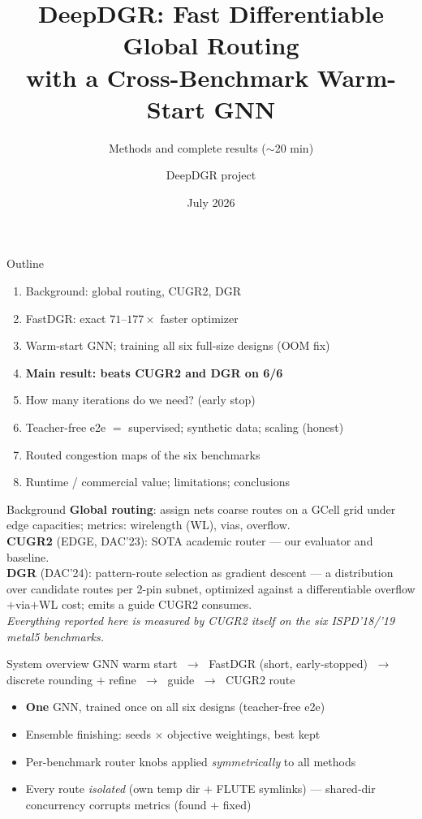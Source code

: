 \documentclass[10pt]{beamer}
\title{DeepDGR: Fast Differentiable Global Routing\\with a Cross-Benchmark Warm-Start GNN}
\subtitle{Methods and complete results (${\sim}$20 min)}
\author{DeepDGR project}
\date{July 2026}
\begin{document}
\begin{frame}\titlepage\end{frame}

\begin{frame}{Outline}
\begin{enumerate}
\item Background: global routing, CUGR2, DGR
\item FastDGR: exact $71$--$177\times$ faster optimizer
\item Warm-start GNN; training all six full-size designs (OOM fix)
\item \textbf{Main result: beats CUGR2 and DGR on 6/6}
\item How many iterations do we need? (early stop)
\item Teacher-free e2e $=$ supervised; synthetic data; scaling (honest)
\item Routed congestion maps of the six benchmarks
\item Runtime / commercial value; limitations; conclusions
\end{enumerate}
\end{frame}

\begin{frame}{Background}
\textbf{Global routing}: assign nets coarse routes on a GCell grid under
edge capacities; metrics: wirelength (WL), vias, overflow.\\[6pt]
\textbf{CUGR2} (EDGE, DAC'23): SOTA academic router --- our evaluator and
baseline.\\[4pt]
\textbf{DGR} (DAC'24): pattern-route selection as gradient descent ---
a distribution over candidate routes per 2-pin subnet, optimized against a
differentiable overflow$+$via$+$WL cost; emits a guide CUGR2 consumes.\\[8pt]
\emph{Everything reported here is measured by CUGR2 itself on the six
ISPD'18/'19 metal5 benchmarks.}
\end{frame}

\begin{frame}{System overview}
\centering
\small
GNN warm start $\;\rightarrow\;$ FastDGR (short, early-stopped)
$\;\rightarrow\;$ discrete rounding $+$ refine
$\;\rightarrow\;$ guide $\;\rightarrow\;$ CUGR2 route\\[10pt]
\begin{itemize}
\item \textbf{One} GNN, trained once on all six designs (teacher-free e2e)
\item Ensemble finishing: seeds $\times$ objective weightings, best kept
\item Per-benchmark router knobs applied \emph{symmetrically} to all methods
\item Every route \emph{isolated} (own temp dir $+$ FLUTE symlinks) ---
      shared-dir concurrency corrupts metrics (found + fixed)
\end{itemize}
\end{frame}
\end{document}
